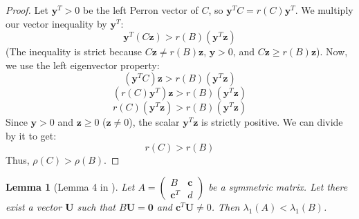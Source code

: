 \documentclass[12pt,a4paper]{report}
\theoremstyle{plain}
\newtheorem{lemma}[theorem]{Lemma}
\theoremstyle{definition}
\theoremstyle{remark}
\begin{document}
\begin{proof}
Let $\bm{y}^T > 0$ be the left Perron vector of $C$, so $\bm{y}^T C = r(C) \bm{y}^T$.
We multiply our vector inequality by $\bm{y}^T$:
$$ \bm{y}^T (C\bm{z}) > r(B) (\bm{y}^T \bm{z}) $$
(The inequality is strict because $C\bm{z} \ne r(B)\bm{z}$, $\bm{y} > 0$, and $C\bm{z} \ge r(B)\bm{z}$).
Now, we use the left eigenvector property:
$$ ( \bm{y}^T C) \bm{z} > r(B) (\bm{y}^T \bm{z}) $$
$$ (r(C) \bm{y}^T) \bm{z} > r(B) (\bm{y}^T \bm{z}) $$
$$ r(C) (\bm{y}^T \bm{z}) > r(B) (\bm{y}^T \bm{z}) $$
Since $\bm{y} > 0$ and $\bm{z} \ge 0$ ($\bm{z} \ne 0$), the scalar $\bm{y}^T \bm{z}$ is strictly positive. We can divide by it to get:
$$ r(C) > r(B) $$
Thus, $\rho(C) > \rho(B)$.
\end{proof}

\begin{lemma}[Lemma 4 in \cite{main_paper}]
Let $A = \begin{pmatrix} B & \bm{c} \\ \bm{c}^T & d \end{pmatrix}$ be a symmetric matrix. Let there exist a vector $\bm{U}$ such that $B\bm{U} = \bm{0}$ and $\bm{c}^T \bm{U} \ne 0$. Then $\lambda_1(A) < \lambda_1(B)$.
\end{lemma}
\end{document}
